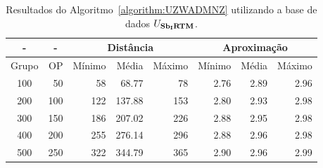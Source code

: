 \begin{table}[!htb]
  \caption{Resultados do Algoritmo~\ref{algorithm:UZWADMNZ} utilizando a base de dados $U_{\textbf{Sb\textsubscript{I}RTM}}{}$.}
  \label{table:KSZBCEZE}
  \centering
  \begin{tabular}{|c|r|r|r|r|r|r|r|}
    \hline
      -      & \multicolumn{1}{c|}{-} & \multicolumn{3}{c|}{Distância}             & \multicolumn{3}{c|}{Aproximação}           \\ \hline
    Grupo    & OP                     & Mínimo       & Média        & Máximo       & Mínimo       & Média        & Máximo       \\ \hline  
    100      & 50                     & 58           &  68.77       & 78           & 2.76         & 2.89         & 2.96         \\ \hline
    200      & 100                    & 122          & 137.88       & 153          & 2.80         & 2.93         & 2.98         \\ \hline
    300      & 150                    & 186          & 207.02       & 226          & 2.88         & 2.95         & 2.98         \\ \hline
    400      & 200                    & 255          & 276.14       & 296          & 2.88         & 2.96         & 2.98         \\ \hline
    500      & 250                    & 322          & 344.79       & 365          & 2.90         & 2.96         & 2.99         \\ \hline    
  \end{tabular}
\end{table}